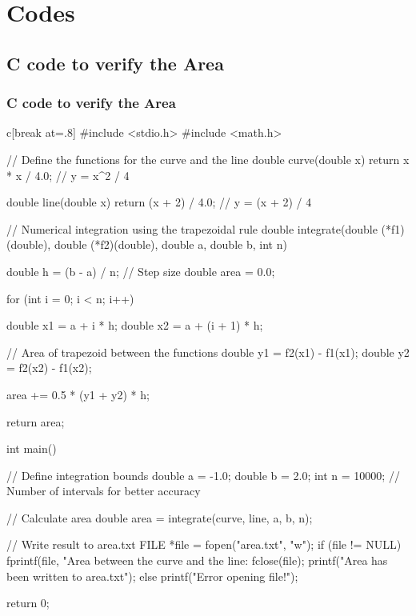 \documentclass{beamer}
\theoremstyle{remark}
\numberwithin{equation}{section}
\begin{document}
\section{Codes}
\subsection{C code to verify the Area}

\begin{frame}
\frametitle{C code to verify the Area}
\begin{mintedbox}{c}[break at=.8\textheight]
#include <stdio.h>
#include <math.h>

// Define the functions for the curve and the line
double curve(double x) {
    return x * x / 4.0;  // y = x^2 / 4
}

double line(double x) {
    return (x + 2) / 4.0;  // y = (x + 2) / 4
}

// Numerical integration using the trapezoidal rule
double integrate(double (*f1)(double), double (*f2)(double), double a, double b, int n) {
    double h = (b - a) / n;  // Step size
    double area = 0.0;

    for (int i = 0; i < n; i++) {
        double x1 = a + i * h;
        double x2 = a + (i + 1) * h;

        // Area of trapezoid between the functions
        double y1 = f2(x1) - f1(x1);
        double y2 = f2(x2) - f1(x2);

        area += 0.5 * (y1 + y2) * h;
    }

    return area;
}

int main() {
    // Define integration bounds
    double a = -1.0;
    double b = 2.0;
    int n = 10000;  // Number of intervals for better accuracy

    // Calculate area
    double area = integrate(curve, line, a, b, n);

    // Write result to area.txt
    FILE *file = fopen("area.txt", "w");
    if (file != NULL) {
        fprintf(file, "Area between the curve and the line: %
        fclose(file);
        printf("Area has been written to area.txt\n");
    } else {
        printf("Error opening file!\n");
    }

    return 0;
}

  \end{mintedbox}
\end{frame}
\end{document}
